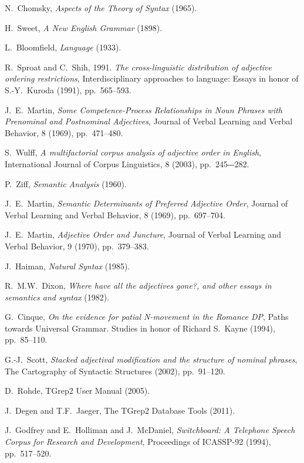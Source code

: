 \documentclass[12pt]{article}
\begin{document}
\begin{thebibliography}{10}
	N.~Chomsky, {\em Aspects of the Theory of Syntax} (1965).
	
	H.~Sweet, {\em A New English Grammar} (1898).
	
	L.~Bloomfield, {\em Language} (1933).
	
	R.~Sproat and C.~Shih, 1991. {\em The cross-linguistic distribution of adjective ordering restrictions}, Interdisciplinary approaches to language: Essays in honor of S.-Y.~Kuroda (1991), pp.~565--593.
	
	J.~E.~Martin, {\em Some Competence-Process Relationships in Noun Phrases with Prenominal and Postnominal Adjectives}, Journal of Verbal Learning and Verbal Behavior, 8 (1969), pp.~471--480. 	
	
	S.~Wulff, {\em A multifactorial corpus analysis of adjective order in English},
	International Journal of Corpus Linguistics, 8 (2003), pp.~245‒-282.
	
	P.~Ziff, {\em Semantic Analysis} (1960).
	
	J.~E.~Martin, {\em Semantic Determinants of Preferred Adjective Order}, Journal of Verbal Learning and Verbal Behavior, 8 (1969), pp.~697--704. 
	
	J.~E.~Martin, {\em Adjective Order and Juncture}, Journal of Verbal Learning and Verbal Behavior, 9 (1970), pp.~379--383. 
	
	J.~Haiman, {\em Natural Syntax} (1985).
	
	R.~M.W.~Dixon, {\em Where have all the adjectives gone?, and other essays in semantics and syntax} (1982).
	
	G.~Cinque, {\em On the evidence for patial N-movement in the Romance DP}, Paths towards Universal Grammar. Studies in honor of Richard S.~Kayne (1994), pp.~85--110.
	
	G.-J.~Scott, {\em Stacked adjectival modification and the structure of nominal phrases}, The Cartography of Syntactic Structures (2002), pp.~91--120.
	
	D.~Rohde, TGrep2 User Manual (2005).
	
	J.~Degen and T.F.~Jaeger, The TGrep2 Database Tools (2011).
	
	J.~Godfrey and E.~Holliman and J.~McDaniel, {\em Switchboard: A Telephone Speech Corpus for Research and Development}, Proceedings of ICASSP-92 (1994),
	pp.~517--520.
\end{thebibliography}


%
%
\end{document}
